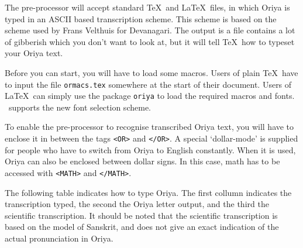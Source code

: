 The pre-processor will accept standard \TeX\ and La\TeX\ files, in which Oriya is typed
in an ASCII based transcription scheme. This scheme is based on the scheme used
by Frans Velthuis for Devanagari. The output is a file contains a lot
of gibberish which you don't want to look at, but it will tell \TeX\ how to
typeset your Oriya text. 

Before you can start, you will have to load some macros.
Users of plain \TeX\ have to input the file {\tt ormacs.tex} somewhere at the
start of their document.
Users of La\TeX\ can simply use the package {\tt oriya} to load the
required macros and fonts. \ortex\ supports the new font selection scheme.

To enable the pre-processor to recognise transcribed Oriya text, you will have to
enclose it in between the tags {\tt <OR>} and {\tt </OR>}. A special `dollar-mode' is
supplied for people who have to switch from Oriya to English constantly. When it
is used, Oriya can also be enclosed between dollar signs. In this case, math
has to be accessed with {\tt <MATH>} and {\tt </MATH>}.

The following table indicates how to type Oriya. The first collumn indicates the
transcription typed, the second the Oriya letter output, and the third the
scientific transcription. It should be noted that the scientific transcription
is based on the model of Sanskrit, and does not give an exact indication of the
actual pronunciation in Oriya.

\bigskip

